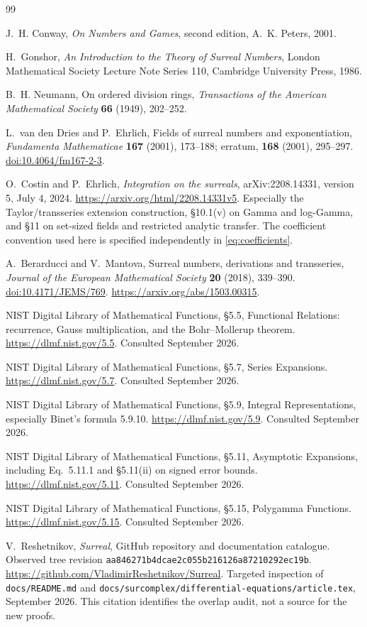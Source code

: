 \documentclass[11pt,letterpaper]{article}
\numberwithin{equation}{section}
\theoremstyle{plain}
\theoremstyle{definition}
\theoremstyle{remark}
\newcommand{\commit}{\nolinkurl{aa846271b4dcae2c055b216126a87210292ec19b}}
\begin{document}
\begin{thebibliography}{99}

J.~H. Conway,
\emph{On Numbers and Games}, second edition,
A.~K. Peters, 2001.

H.~Gonshor,
\emph{An Introduction to the Theory of Surreal Numbers},
London Mathematical Society Lecture Note Series 110,
Cambridge University Press, 1986.

B.~H. Neumann,
On ordered division rings,
\emph{Transactions of the American Mathematical Society}
\textbf{66} (1949), 202--252.

L.~van den Dries and P.~Ehrlich,
Fields of surreal numbers and exponentiation,
\emph{Fundamenta Mathematicae} \textbf{167} (2001), 173--188;
erratum, \textbf{168} (2001), 295--297.
\href{https://doi.org/10.4064/fm167-2-3}{doi:10.4064/fm167-2-3}.

O.~Costin and P.~Ehrlich,
\emph{Integration on the surreals},
arXiv:2208.14331, version 5, July 4, 2024.
\url{https://arxiv.org/html/2208.14331v5}.
Especially the Taylor/transseries extension construction, \S10.1(v) on
Gamma and log-Gamma, and \S11 on set-sized fields and restricted analytic
transfer. The coefficient convention used here is specified independently
in \eqref{eq:coefficients}.

A.~Berarducci and V.~Mantova,
Surreal numbers, derivations and transseries,
\emph{Journal of the European Mathematical Society}
\textbf{20} (2018), 339--390.
\href{https://doi.org/10.4171/JEMS/769}{doi:10.4171/JEMS/769}.
\url{https://arxiv.org/abs/1503.00315}.

NIST Digital Library of Mathematical Functions,
\S5.5, Functional Relations: recurrence, Gauss multiplication, and the
Bohr--Mollerup theorem.
\url{https://dlmf.nist.gov/5.5}.
Consulted September 2026.

NIST Digital Library of Mathematical Functions,
\S5.7, Series Expansions.
\url{https://dlmf.nist.gov/5.7}.
Consulted September 2026.

NIST Digital Library of Mathematical Functions,
\S5.9, Integral Representations, especially Binet's formula 5.9.10.
\url{https://dlmf.nist.gov/5.9}.
Consulted September 2026.

NIST Digital Library of Mathematical Functions,
\S5.11, Asymptotic Expansions, including Eq.~5.11.1 and \S5.11(ii)
on signed error bounds.
\url{https://dlmf.nist.gov/5.11}.
Consulted September 2026.

NIST Digital Library of Mathematical Functions,
\S5.15, Polygamma Functions.
\url{https://dlmf.nist.gov/5.15}.
Consulted September 2026.

V.~Reshetnikov,
\emph{Surreal}, GitHub repository and documentation catalogue.
Observed tree revision \commit.
\url{https://github.com/VladimirReshetnikov/Surreal}.
Targeted inspection of \texttt{docs/README.md} and
\texttt{docs/surcomplex/differential-equations/article.tex}, September 2026.
This citation identifies the overlap audit, not a source for the new proofs.

\end{thebibliography}
\end{document}
